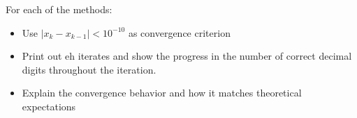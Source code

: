 \documentclass[12pt]{article}
\newcommand{\abs}[1]{\left| #1 \right|}
\begin{document}
\begin{enumerate}
\begin{enumerate}
\begin{enumerate}
  \end{enumerate}
  For each of the methods:
  \begin{itemize}
    \item Use $\abs{ x_{k} - x_{k-1}} < 10^{-10}$ as convergence criterion
    \item Print out eh iterates and show the progress in the number of correct decimal
    digits throughout the iteration.
    \item Explain the convergence behavior and how it matches theoretical expectations
  \end{itemize}
\end{enumerate}
\end{enumerate}

\end{document}

